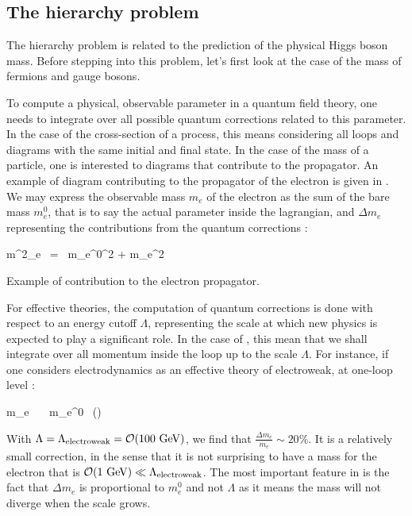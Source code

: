         \subsection{The hierarchy problem}

    The hierarchy problem is related to the prediction of the physical Higgs boson mass.
    Before stepping into this problem, let's first look at the case of the mass of fermions
    and gauge bosons.

    To compute a physical, observable parameter in a quantum field theory, one needs to
    integrate over all possible quantum corrections related to this parameter. In the case
    of the cross-section of a process, this means considering all loops and diagrams
    with the same initial and final state. In the case of the mass of a particle, one is
    interested to diagrams that contribute to the propagator. An example of diagram contributing
    to the propagator of the electron is given in . We may
    express the observable mass $m_e$ of the electron as the sum of the bare mass $m^0_{e}$,
    that is to say the actual parameter inside the lagrangian, and $\Delta m_e$ representing
    the contributions from the quantum corrections :

    {
        m^2_e \, = \, {m_e^0}^2 + \Delta m_e^2
    }

                 {Example of contribution to the electron propagator.}

    For effective theories, the computation of quantum corrections is done with respect to
    an energy cutoff $\Lambda$, representing the scale at which new physics is expected
    to play a significant role. In the case of , this mean
    that we shall integrate over all momentum inside the loop up to the scale $\Lambda$.
    For instance, if one considers electrodynamics as an effective theory of electroweak,
    at one-loop level :

    {
        \Delta m_e \, \simeq \, \frac{\alpha}{4\pi} \, m_e^0 \, \left(\right)
    }

    With $\Lambda = \Lambda_{\text{electroweak}} = \mathcal{O}(100~\text{GeV})$, we find that
    $\frac{\Delta m_e}{m_e} \sim 20\%$. It is a relatively small correction, in the sense
    that it is not surprising to have a mass for the electron that is $\mathcal{O}(1~\text{GeV}) \ll \Lambda_{\text{electroweak}}$.
    The most important feature in  is the fact that $\Delta m_e$
    is proportional to $m_e^0$ and not $\Lambda$ as it means the mass will not diverge
    when the scale grows.

